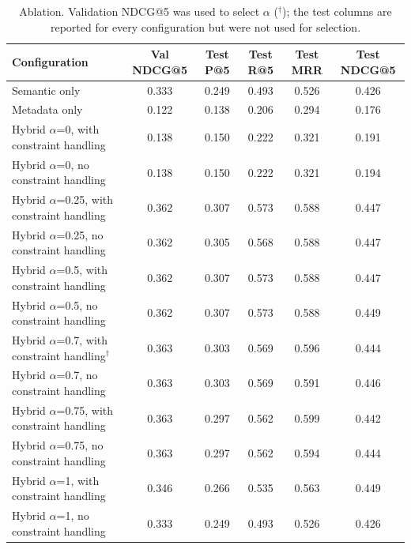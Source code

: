 \begin{table}[t]
\centering
\caption{Ablation. Validation NDCG@5 was used to select $\alpha$ ($^\dagger$); the test columns are reported for every configuration but were not used for selection.}
\label{tab:ablation}
\scriptsize
\begin{tabular}{lccccc}
\toprule
Configuration & Val NDCG@5 & Test P@5 & Test R@5 & Test MRR & Test NDCG@5 \\
\midrule
Semantic only & 0.333 & 0.249 & 0.493 & 0.526 & 0.426 \\
Metadata only & 0.122 & 0.138 & 0.206 & 0.294 & 0.176 \\
Hybrid $\alpha$=0, with constraint handling & 0.138 & 0.150 & 0.222 & 0.321 & 0.191 \\
Hybrid $\alpha$=0, no constraint handling & 0.138 & 0.150 & 0.222 & 0.321 & 0.194 \\
Hybrid $\alpha$=0.25, with constraint handling & 0.362 & 0.307 & 0.573 & 0.588 & 0.447 \\
Hybrid $\alpha$=0.25, no constraint handling & 0.362 & 0.305 & 0.568 & 0.588 & 0.447 \\
Hybrid $\alpha$=0.5, with constraint handling & 0.362 & 0.307 & 0.573 & 0.588 & 0.447 \\
Hybrid $\alpha$=0.5, no constraint handling & 0.362 & 0.307 & 0.573 & 0.588 & 0.449 \\
Hybrid $\alpha$=0.7, with constraint handling$^\dagger$ & 0.363 & 0.303 & 0.569 & 0.596 & 0.444 \\
Hybrid $\alpha$=0.7, no constraint handling & 0.363 & 0.303 & 0.569 & 0.591 & 0.446 \\
Hybrid $\alpha$=0.75, with constraint handling & 0.363 & 0.297 & 0.562 & 0.599 & 0.442 \\
Hybrid $\alpha$=0.75, no constraint handling & 0.363 & 0.297 & 0.562 & 0.594 & 0.444 \\
Hybrid $\alpha$=1, with constraint handling & 0.346 & 0.266 & 0.535 & 0.563 & 0.449 \\
Hybrid $\alpha$=1, no constraint handling & 0.333 & 0.249 & 0.493 & 0.526 & 0.426 \\
\bottomrule
\end{tabular}
\end{table}
